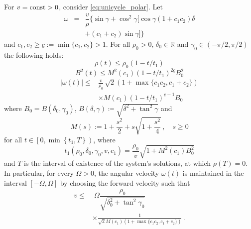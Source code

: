 \documentclass[10pt,a4paper]{amsart}
\begin{document}
\begin{theorem}%
\label{thm:Dubins-FT-stabilize}
For $v=\mbox{\rm const}>0$,  consider \eqref{eq:unicycle_polar}. 
Let
\begin{eqnarray}\label{eq-control-omega}
\omega &=& \dfrac{v}{\rho}\bigl\{
\sin\gamma +\cos^2\gamma\bigl[\cos\gamma
(1+c_1c_2)\delta\nonumber \\
&&+(c_1+c_2)\sin\gamma
\bigr]\bigr\}
\end{eqnarray}
and $c_1,c_2 \geq \underline c :=\min\{c_1,c_2\} >1$. For all $\rho_0>0$, $\delta_0\in\mathbb{R}$ and $\gamma_0\in(-\pi/2,\pi/2)$ the following holds:
\begin{equation}
\label{eq-rho-bound}
\rho(t)\leq \rho_0(1-t/t_1)
\end{equation}
\begin{equation}
\label{eq-deltan-bound}
B^2(t) \leq M^2(c_1)\left( 1- 
t/t_1
\right)^{2\underline c}B^2_0
\end{equation}
\begin{align}
\label{eq-omega(t)-bound}
|\omega(t)| \leq & \frac{v}{\rho_0} \,
\sqrt{2}(1+\max\{c_1c_2,c_1+c_2\})\nonumber\\
&\times M(c_1)\left( 1- t/t_1
\right)^{\underline c -1}B_0
\end{align}
where $B_0 = B(\delta_0,\gamma_0)$, $B(\delta,\gamma) \coloneqq \sqrt{\delta^2 + \tan^2\gamma}$ and
\begin{equation}
M(s) := 
1+\frac{s^2}{2}  + s\sqrt{1+\frac{s^2}{4} }\,, \quad s\geq 0
\label{eq:M}
\end{equation}
for all $t\in\left[0, \min\left\{t_1,T\right\} \right)$, where 
\begin{equation}
t_1(\rho_0,\delta_0, \gamma_0, v,c_1)= \frac{\rho_0}{v}{\sqrt{1+M^2(c_1)B^2_0}}
\end{equation}
and $T$ is the interval of existence of the system's solutions, at which $\rho(T)=0$. In particular, for every $\Omega>0$, the angular velocity $\omega(t)$ is maintained in the interval $[-\Omega,\Omega]$ by choosing the forward velocity such that 
\begin{align}\label{eq-slowdown}
v\leq& \;\Omega\dfrac{\rho_0}{\sqrt{\delta_0^2 +\tan^2\gamma_0}}\nonumber\\
&\times\frac{1}{ \sqrt{2}M(c_1)(1+\max\{c_1c_2,c_1+c_2\})}\,.  
\end{align}
\end{theorem}
\end{document}
